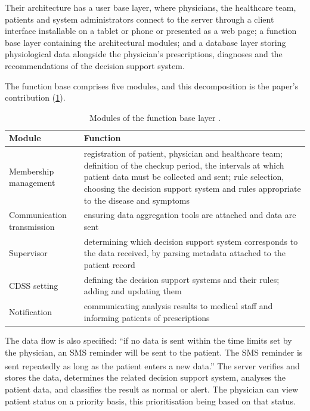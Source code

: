 \documentclass[12pt,a4paper,oneside]{report}
\newcommand{\bq}[1]{``#1''\textsuperscript{\dag}}
\begin{document}
Their architecture has a user base layer, where physicians, the healthcare team, patients and system administrators connect to the server through a client interface installable on a tablet or phone or presented as a web page; a function base layer containing the architectural modules; and a database layer storing physiological data alongside the physician's prescriptions, diagnoses and the recommendations of the decision support system.

The function base comprises five modules, and this decomposition is the paper's contribution (\cref{tab:yazdani-modules}).

\begin{table}[htbp]
\centering\footnotesize
\caption{Modules of the function base layer \parencite{yazdani2018}.}\label{tab:yazdani-modules}
\begin{tabularx}{\textwidth}{@{}>{\raggedright\arraybackslash}p{3.3cm} X@{}}
\toprule
\textbf{Module} & \textbf{Function} \\
\midrule
Membership management & registration of patient, physician and healthcare team; definition of the checkup period, the intervals at which patient data must be collected and sent; rule selection, choosing the decision support system and rules appropriate to the disease and symptoms \\
Communication transmission & ensuring data aggregation tools are attached and data are sent \\
Supervisor & determining which decision support system corresponds to the data received, by parsing metadata attached to the patient record \\
CDSS setting & defining the decision support systems and their rules; adding and updating them \\
Notification & communicating analysis results to medical staff and informing patients of prescriptions \\
\bottomrule
\end{tabularx}
\end{table}

The data flow is also specified: \bq{if no data is sent within the time limits set by the physician, an SMS reminder will be sent to the patient. The SMS reminder is sent repeatedly as long as the patient enters a new data.} The server verifies and stores the data, determines the related decision support system, analyses the patient data, and classifies the result as normal or alert. The physician can view patient status on a priority basis, this prioritisation being based on that status.
\end{document}

